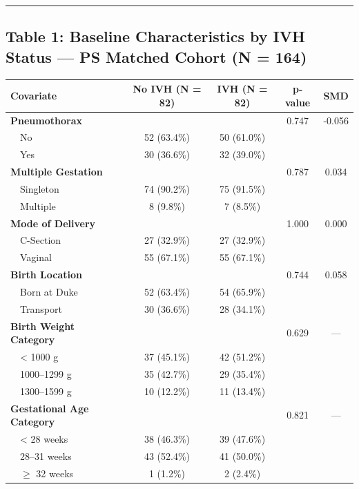 \documentclass[
]{article}
\begin{document}
\begin{center}\rule{0.5\linewidth}{0.5pt}\end{center}

\hypertarget{table-1-baseline-characteristics-by-ivh-status-ps-matched-cohort-n-164}{%
\subsection{Table 1: Baseline Characteristics by IVH Status --- PS
Matched Cohort (N =
164)}\label{table-1-baseline-characteristics-by-ivh-status-ps-matched-cohort-n-164}}

\begin{longtable}[]{@{}lcccc@{}}
\toprule
Covariate & No IVH (N = 82) & IVH (N = 82) & p-value & SMD \\
\midrule
\endhead
\textbf{Pneumothorax} & & & 0.747 & -0.056 \\
 No & 52 (63.4\%) & 50 (61.0\%) & & \\
 Yes & 30 (36.6\%) & 32 (39.0\%) & & \\
\textbf{Multiple Gestation} & & & 0.787 & 0.034 \\
 Singleton & 74 (90.2\%) & 75 (91.5\%) & & \\
 Multiple & 8 (9.8\%) & 7 (8.5\%) & & \\
\textbf{Mode of Delivery} & & & 1.000 & 0.000 \\
 C-Section & 27 (32.9\%) & 27 (32.9\%) & & \\
 Vaginal & 55 (67.1\%) & 55 (67.1\%) & & \\
\textbf{Birth Location} & & & 0.744 & 0.058 \\
 Born at Duke & 52 (63.4\%) & 54 (65.9\%) & & \\
 Transport & 30 (36.6\%) & 28 (34.1\%) & & \\
\textbf{Birth Weight Category} & & & 0.629 & --- \\
 \textless{} 1000 g & 37 (45.1\%) & 42 (51.2\%) & & \\
 1000--1299 g & 35 (42.7\%) & 29 (35.4\%) & & \\
 1300--1599 g & 10 (12.2\%) & 11 (13.4\%) & & \\
\textbf{Gestational Age Category} & & & 0.821 & --- \\
 \textless{} 28 weeks & 38 (46.3\%) & 39 (47.6\%) & & \\
 28--31 weeks & 43 (52.4\%) & 41 (50.0\%) & & \\
 \(\geq\) 32 weeks & 1 (1.2\%) & 2 (2.4\%) & & \\
\bottomrule
\end{longtable}
\end{document}
